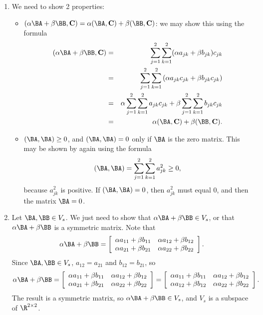 \begin{enumerate}
\item We need to show 2 properties:
\begin{itemize}
\item $(\alpha\BA + \beta\BB, {\bf C}) = \alpha(\BA,{\bf C}) + \beta(\BB,{\bf C})$: we may show this using the formula
\begin{eqnarray*}
(\alpha\BA + \beta\BB, {\bf C}) &=& \sum_{j=1}^2\sum_{k=1}^2 (\alpha a_{jk} + \beta b_{jk})c_{jk} \\
&=& \sum_{j=1}^2\sum_{k=1}^2\left( \alpha a_{jk}c_{jk} + \beta b_{jk}c_{jk}\right)\\
&=& \alpha \sum_{j=1}^2\sum_{k=1}^2 a_{jk}c_{jk} + \beta \sum_{j=1}^2\sum_{k=1}^2 b_{jk}c_{jk}\\
&=& \alpha(\BA,{\bf C}) + \beta(\BB,{\bf C}).
\end{eqnarray*}
\item $(\BA,\BA) \geq 0$, and $(\BA,\BA) = 0$ only if $\BA$ is the zero matrix.  This may be shown by again using the formula
\[
(\BA,\BA) =  \sum_{j=1}^2\sum_{k=1}^2 a_{jk}^2 \geq 0,
\]
because $a_{jk}^2$ is positive.  If $(\BA,\BA) = 0$, then $a_{jk}^2$ must equal 0, and then the matrix $\BA = 0$.  
\end{itemize}
\item Let $\BA,\BB \in V_s$.  We just need to show that $\alpha \BA + \beta\BB \in V_s$, or that $\alpha \BA + \beta\BB$ is a symmetric matrix.  Note that
\[
\alpha \BA + \beta\BB = \left[
\begin{array}{cc}
\alpha a_{11} + \beta b_{11}& \alpha a_{12} + \beta b_{12}\\
\alpha a_{21} + \beta b_{21}& \alpha a_{22} + \beta b_{22}
\end{array}
\right].
\]
Since $\BA,\BB \in V_s$, $a_{12} = a_{21}$ and $b_{12} = b_{21}$, so 
\[
\alpha \BA + \beta\BB = \left[
\begin{array}{cc}
\alpha a_{11} + \beta b_{11}& \alpha a_{12} + \beta b_{12}\\
\alpha a_{21} + \beta b_{21}& \alpha a_{22} + \beta b_{22}
\end{array}
\right]
= \left[
\begin{array}{cc}
\alpha a_{11} + \beta b_{11}& \alpha a_{12} + \beta b_{12}\\
\alpha a_{12} + \beta b_{12}& \alpha a_{22} + \beta b_{22}
\end{array}
\right].
\]
The result is a symmetric matrix, so $\alpha \BA + \beta\BB\in V_s$, and $V_s$ is a subspace of $\R^{2\times 2}$.  

\end{enumerate}
